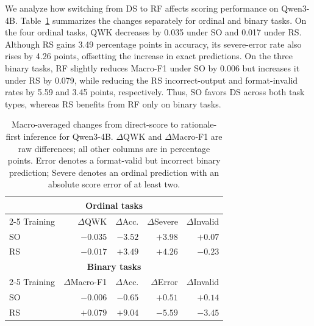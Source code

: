 
We analyze how switching from DS to RF affects scoring performance on
Qwen3-4B. Table~\ref{tab:interface-changes-by-task-type} summarizes the
changes separately for ordinal and binary tasks. On the four ordinal tasks,
QWK decreases
by 0.035 under SO and 0.017 under RS. Although RS gains 3.49 percentage
points in accuracy, its severe-error rate also rises by 4.26 points,
offsetting the increase in exact predictions. On the three binary tasks,
RF slightly reduces Macro-F1 under SO by 0.006 but increases it under RS
by 0.079, while reducing the RS incorrect-output and format-invalid rates
by 5.59 and 3.45 points, respectively. Thus, SO favors DS across both
task types, whereas RS benefits from RF only on binary tasks.

\begin{table}[!t]
\centering
\small
\renewcommand{\arraystretch}{1.2}
\setlength{\tabcolsep}{4pt}
\begin{tabular}{@{}lrrrr@{}}
\toprule
\multicolumn{5}{c}{\textbf{Ordinal tasks}} \\
\cmidrule(lr){2-5}
Training & $\Delta$QWK & $\Delta$Acc. & $\Delta$Severe & $\Delta$Invalid \\
\midrule
SO & $-0.035$ & $-3.52$ & $+3.98$ & $+0.07$ \\
RS & $-0.017$ & $+3.49$ & $+4.26$ & $-0.23$ \\
\midrule
\multicolumn{5}{c}{\textbf{Binary tasks}} \\
\cmidrule(lr){2-5}
Training & $\Delta$Macro-F1 & $\Delta$Acc. & $\Delta$Error & $\Delta$Invalid \\
\midrule
SO & $-0.006$ & $-0.65$ & $+0.51$ & $+0.14$ \\
RS & $+0.079$ & $+9.04$ & $-5.59$ & $-3.45$ \\
\bottomrule
\end{tabular}
\caption{Macro-averaged changes from direct-score to rationale-first
inference for Qwen3-4B. $\Delta$QWK and $\Delta$Macro-F1 are raw
differences; all other columns are in percentage points. Error denotes
a format-valid but incorrect binary prediction; Severe denotes an
ordinal prediction with an absolute score error of at least two.}
\label{tab:interface-changes-by-task-type}
\end{table}

